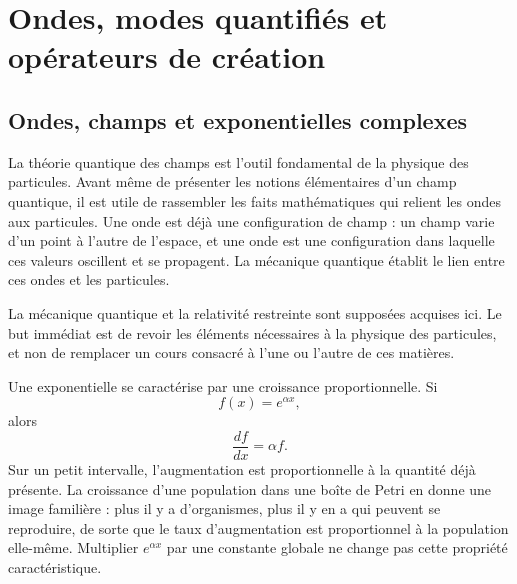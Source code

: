 \chapter{Ondes, modes quantifiés et opérateurs de création}

\section{Ondes, champs et exponentielles complexes}

La théorie quantique des champs est l’outil fondamental de la physique des particules. Avant même de présenter les notions élémentaires d’un champ quantique, il est utile de rassembler les faits mathématiques qui relient les ondes aux particules. Une onde est déjà une configuration de champ : un champ varie d’un point à l’autre de l’espace, et une onde est une configuration dans laquelle ces valeurs oscillent et se propagent. La mécanique quantique établit le lien entre ces ondes et les particules.

La mécanique quantique et la relativité restreinte sont supposées acquises ici. Le but immédiat est de revoir les éléments nécessaires à la physique des particules, et non de remplacer un cours consacré à l’une ou l’autre de ces matières.

Une exponentielle se caractérise par une croissance proportionnelle. Si
\begin{equation}
f(x)=e^{\alpha x},
\end{equation}
alors
\begin{equation}
\frac{df}{dx}=\alpha f.
\end{equation}
Sur un petit intervalle, l’augmentation est proportionnelle à la quantité déjà présente. La croissance d’une population dans une boîte de Petri en donne une image familière : plus il y a d’organismes, plus il y en a qui peuvent se reproduire, de sorte que le taux d’augmentation est proportionnel à la population elle-même. Multiplier \(e^{\alpha x}\) par une constante globale ne change pas cette propriété caractéristique.

